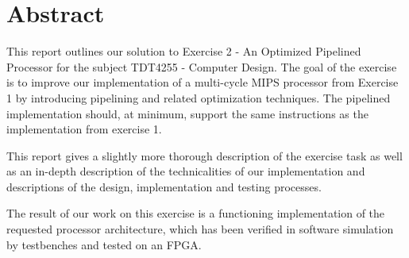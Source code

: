 \chapter*{Abstract}

This report outlines our solution to Exercise 2 - An Optimized Pipelined Processor for the subject TDT4255 - Computer Design.
The goal of the exercise is to improve our implementation of a multi-cycle MIPS processor from Exercise 1 by introducing pipelining and related optimization techniques.
The pipelined implementation should, at minimum, support the same instructions as the implementation from exercise 1.

This report gives a slightly more thorough description of the exercise task as well as an in-depth description of the technicalities of our implementation and descriptions of the design, implementation and testing processes.

The result of our work on this exercise is a functioning implementation of the requested processor architecture, which has been verified in software simulation by testbenches and tested on an FPGA.
